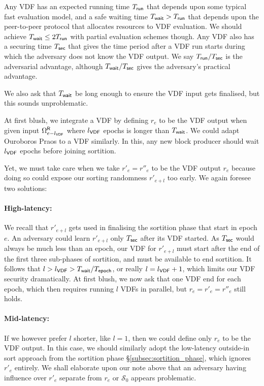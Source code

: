 Any VDF has an expected running time $T_{\mathsf{run}}$ that depends upon some typical fast evaluation model, and a safe waiting time $T_{\mathsf{wait}} > T_{\mathsf{run}}$ that depends upon the peer-to-peer protocol that allocates resources to VDF evaluation.  We should achieve $T_{\mathsf{wait}} \le 2 T_{\mathsf{run}}$ with partial evaluation schemes though.  Any VDF also has a securing time $T_{\mathsf{sec}}$ that gives the time period after a VDF run starts during which the adversary does not know the VDF output.  We say $T_{\mathsf{run}}/T_{\mathsf{sec}}$ is the adversarial advantage, although $T_{\mathsf{wait}}/T_{\mathsf{sec}}$ gives the adversary's practical advantage.  

We also ask that $T_{\mathsf{wait}}$ be long enough to ensure the VDF input gets finalised, but this sounds unproblematic.  

At first blush, we integrate a VDF by defining $r_e$ to be the VDF output when given input $\Omega^{\mathsf{R}}_{e-l_{\mathsf{VDF}}}$ where $l_{\mathsf{VDF}}$ epochs is longer than $T_{\mathsf{wait}}$.  We could adapt Ouroboros Praos \cite{Praos} to a VDF similarly.  In this, any new block producer should wait $l_{\mathsf{VDF}}$ epochs before joining sortition. 

Yet, we must take care when we take $r'_e = r''_e$ to be the VDF output $r_e$ because doing so could expose our sorting randomness $r'_{e+l}$ too early.  We again foresee two solutions:

\paragraph{High-latency:} 
We recall that $r'_{e+l}$ gets used in finalising the sortition phase that start in epoch $e$.  An adversary could learn $r'_{e+l}$ only $T_{\mathsf{sec}}$ after its VDF started.  As $T_{\mathsf{sec}}$ would always be much less than an epoch, our VDF for $r'_{e+l}$ must start after the end of the first three sub-phases of sortition, and must be available to end sortition.  It follows that $l > l_{\mathsf{VDF}} > T_{\mathsf{wait}}/T_{\mathsf{epoch}}$, or really $l = l_{\mathsf{VDF}} + 1$, which limits our VDF security dramatically.  At first blush, we now ask that one VDF end for each epoch, which then requires running $l$ VDFs in parallel, but $r_e = r'_e = r''_e$ still holds.

\paragraph{Mid-latency:} 
If we however prefer $l$ shorter, like $l=1$, then we could define only $r_e$ to be the VDF output.  In this case, we should similarly adopt the low-latency outside-in sort approach from the sortition phase \S\ref{subsec:sortition_phase}, which ignores $r'_e$ entirely.  We shall elaborate upon our note above that an adversary having influence over $r'_e$ separate from $r_e$ or $\mathcal{S}_0$ appears problematic.

